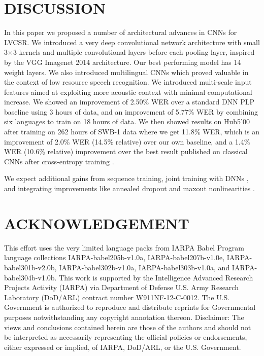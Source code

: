 \documentclass{article}
\begin{document}
\section{DISCUSSION}
In this paper we proposed a number of architectural advances in CNNs for LVCSR.
We introduced a very deep convolutional network architecture with small 3$\times$3 kernels
and multiple convolutional layers before each pooling layer, inspired by the VGG Imagenet 2014 architecture.
Our best performing model has 14 weight layers.
We also introduced multilingual CNNs which proved valuable in the context
of low resource speech recognition.
We introduced multi-scale input features aimed at exploiting more acoustic context
with minimal computational increase.
We showed an improvement of 2.50\% WER over a standard DNN PLP baseline using 3 hours of data,
and an improvement of 5.77\% WER by combining six languages to train on 18 hours of data.
We then showed results on Hub5'00 after training on 262 hours of SWB-1 data where we get 
11.8\% WER, which is
an improvement of 2.0\% WER (14.5\% relative) over our own baseline, and a 
1.4\% WER (10.6\% relative) improvement over the best
result published on classical CNNs after cross-entropy training \cite{soltau2014joint}.

We expect additional gains from sequence training, joint training with DNNs \cite{soltau2014joint}, and
integrating improvements like annealed dropout and maxout nonlinearities \cite{saon2015ibm}.

\section{ACKNOWLEDGEMENT}
This effort uses the very limited language packs from IARPA Babel
Program language collections IARPA-babel205b-v1.0a,
IARPA-babel207b-v1.0e, IARPA-babel301b-v2.0b, IARPA-babel302b-v1.0a,
IARPA-babel303b-v1.0a, and IARPA-babel304b-v1.0b.  This work is
supported by the Intelligence Advanced Research Projects Activity
(IARPA) via Department of Defense U.S. Army Research Laboratory
(DoD/ARL) contract number W911NF-12-C-0012. The U.S. Government is
authorized to reproduce and distribute reprints for Governmental
purposes notwithstanding any copyright annotation thereon.
Disclaimer: The views and conclusions contained herein are those of
the authors and should not be interpreted as necessarily representing
the official policies or endorsements, either expressed or implied, of
IARPA, DoD/ARL, or the U.S. Government.
\end{document}
